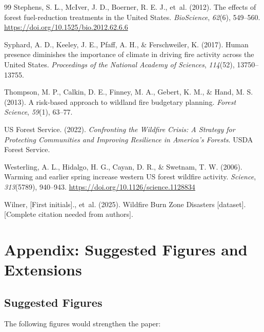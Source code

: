 \documentclass[12pt, letterpaper]{article}
\begin{document}
\begin{thebibliography}{99}
Stephens, S. L., McIver, J. D., Boerner, R. E. J., et~al. (2012). The effects of forest fuel-reduction treatments in the United States. \textit{BioScience}, \textit{62}(6), 549--560. \url{https://doi.org/10.1525/bio.2012.62.6.6}

Syphard, A. D., Keeley, J. E., Pfaff, A. H., \& Ferschweiler, K. (2017). Human presence diminishes the importance of climate in driving fire activity across the United States. \textit{Proceedings of the National Academy of Sciences}, \textit{114}(52), 13750--13755.

Thompson, M. P., Calkin, D. E., Finney, M. A., Gebert, K. M., \& Hand, M. S. (2013). A risk-based approach to wildland fire budgetary planning. \textit{Forest Science}, \textit{59}(1), 63--77.

US Forest Service. (2022). \textit{Confronting the Wildfire Crisis: A Strategy for Protecting Communities and Improving Resilience in America's Forests}. USDA Forest Service.

Westerling, A. L., Hidalgo, H. G., Cayan, D. R., \& Swetnam, T. W. (2006). Warming and earlier spring increase western US forest wildfire activity. \textit{Science}, \textit{313}(5789), 940--943. \url{https://doi.org/10.1126/science.1128834}

Wilner, [First initials]., et~al. (2025). Wildfire Burn Zone Disasters [dataset]. [Complete citation needed from authors].

\end{thebibliography}


\newpage
\appendix
\doublespacing
\section{Appendix: Suggested Figures and Extensions}

\subsection{Suggested Figures}

The following figures would strengthen the paper:
\end{document}
